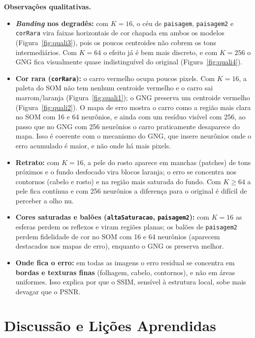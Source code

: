 \documentclass[11pt,a4paper]{article}
\begin{document}
\textbf{Observações qualitativas.}
\begin{itemize}
    \item \textbf{\textit{Banding} nos degradês:} com $K=16$, o céu de \texttt{paisagem}, \texttt{paisagem2} e \texttt{corRara} vira faixas horizontais de cor chapada em ambos os modelos (Figura~\ref{fig:quali3}), pois os poucos centroides não cobrem os tons intermediários. Com $K=64$ o efeito já é bem mais discreto, e com $K=256$ o GNG fica visualmente quase indistinguível do original (Figura~\ref{fig:quali4}).
    \item \textbf{Cor rara (\texttt{corRara}):} o carro vermelho ocupa poucos pixels. Com $K=16$, a paleta do SOM não tem nenhum centroide vermelho e o carro sai marrom/laranja (Figura~\ref{fig:quali1}); o GNG preserva um centroide vermelho (Figura~\ref{fig:quali2}). O mapa de erro mostra o carro como a região mais clara no SOM com 16 e 64 neurônios, e ainda com um resíduo visível com 256, ao passo que no GNG com 256 neurônios o carro praticamente desaparece do mapa. Isso é coerente com o mecanismo do GNG, que insere neurônios onde o erro acumulado é maior, e não onde há mais pixels.
    \item \textbf{Retrato:} com $K=16$, a pele do rosto aparece em manchas (patches) de tons próximos e o fundo desfocado vira blocos laranja; o erro se concentra nos contornos (cabelo e rosto) e na região mais saturada do fundo. Com $K\ge 64$ a pele fica contínua e com 256 neurônios a diferença para o original é difícil de perceber a olho nu.
    \item \textbf{Cores saturadas e balões (\texttt{altaSaturacao}, \texttt{paisagem2}):} com $K=16$ as esferas perdem os reflexos e viram regiões planas; os balões de \texttt{paisagem2} perdem fidelidade de cor no SOM com 16 e 64 neurônios (aparecem destacados nos mapas de erro), enquanto o GNG os preserva melhor.
    \item \textbf{Onde fica o erro:} em todas as imagens o erro residual se concentra em \textbf{bordas e texturas finas} (folhagem, cabelo, contornos), e não em áreas uniformes. Isso explica por que o SSIM, sensível à estrutura local, sobe mais devagar que o PSNR.
\end{itemize}

\section{Discussão e Lições Aprendidas}
\label{sec:disc}
\end{document}
